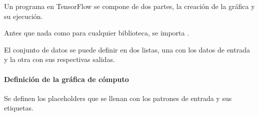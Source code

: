 Un programa en TensorFlow se compone de dos partes,
la creación de la gráfica y su ejecución.

Antes que nada como para cualquier biblioteca, se importa .

\begin{sphinxVerbatim}[commandchars=\\\{\}]
   
\end{sphinxVerbatim}

El conjunto de datos se puede definir en dos listas, una con los datos
de entrada y la otra con sus respectivas salidas.

\begin{sphinxVerbatim}[commandchars=\\\{\}]
  \PYG{p}{[}\PYG{p}{[} \PYG{p}{]} \PYG{p}{[} \PYG{p}{]} \PYG{p}{[} \PYG{p}{]} \PYG{p}{[} \PYG{p}{]}\PYG{p}{]} 
  \PYG{p}{[}\PYG{p}{[}\PYG{p}{]} \PYG{p}{[}\PYG{p}{]} \PYG{p}{[}\PYG{p}{]} \PYG{p}{[}\PYG{p}{]}\PYG{p}{]} 
\end{sphinxVerbatim}


\paragraph{Definición de la gráfica de cómputo}

Se definen los placeholders que se llenan con los patrones de entrada y sus etiquetas.

\begin{sphinxVerbatim}[commandchars=\\\{\}]
   \PYG{p}{[} \PYG{p}{]} 
   \PYG{p}{[} \PYG{p}{]} 
\end{sphinxVerbatim}

